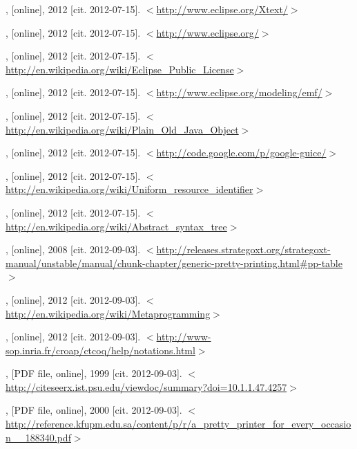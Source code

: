 \documentclass[12pt,notitlepage,a4paper]{report}
\begin{document}
\begin{thebibliography}{99}

, [online], 2012 [cit. 2012-07-15]. $<$\url{http://www.eclipse.org/Xtext/}$>$

, [online], 2012 [cit. 2012-07-15]. $<$\url{http://www.eclipse.org/}$>$

, [online], 2012 [cit. 2012-07-15]. $<$\url{http://en.wikipedia.org/wiki/Eclipse_Public_License}$>$

, [online], 2012 [cit. 2012-07-15]. $<$\url{http://www.eclipse.org/modeling/emf/}$>$

, [online], 2012 [cit. 2012-07-15]. $<$\url{http://en.wikipedia.org/wiki/Plain_Old_Java_Object}$>$

, [online], 2012 [cit. 2012-07-15]. $<$\url{http://code.google.com/p/google-guice/}$>$

, [online], 2012 [cit. 2012-07-15]. $<$\url{http://en.wikipedia.org/wiki/Uniform_resource_identifier}$>$

, [online], 2012 [cit. 2012-07-15]. $<$\url{http://en.wikipedia.org/wiki/Abstract_syntax_tree}$>$

, [online], 2008 [cit. 2012-09-03]. $<$\url{http://releases.strategoxt.org/strategoxt-manual/unstable/manual/chunk-chapter/generic-pretty-printing.html#pp-table}$>$

, [online], 2012 [cit. 2012-09-03]. $<$\url{http://en.wikipedia.org/wiki/Metaprogramming}$>$

, [online], 2012 [cit. 2012-09-03]. $<$\url{http://www-sop.inria.fr/croap/ctcoq/help/notations.html}$>$

, [PDF file, online], 1999 [cit. 2012-09-03]. $<$\url{http://citeseerx.ist.psu.edu/viewdoc/summary?doi=10.1.1.47.4257}$>$

, [PDF file, online], 2000 [cit. 2012-09-03]. $<$\url{http://reference.kfupm.edu.sa/content/p/r/a_pretty_printer_for_every_occasion__188340.pdf}$>$


\end{thebibliography}
\end{document}
